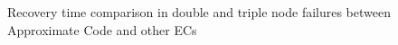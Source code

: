 \documentclass[sigconf]{acmart}
\begin{document}
\begin{figure}[ht]
\vspace{-0.3cm}
\caption{Recovery time comparison in double and triple node failures between Approximate Code and other ECs}\label{fig-recovery}
\vspace{-3mm}
\end{figure}
\end{document}
